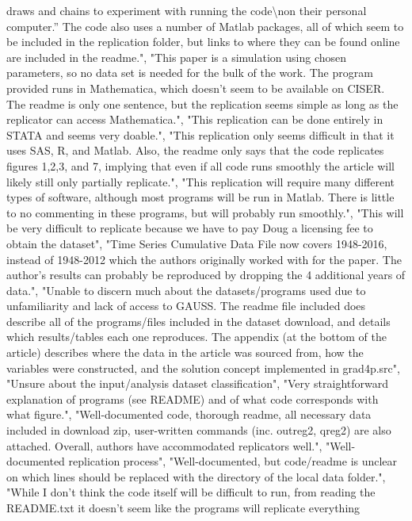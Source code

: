 \documentclass[]{article}
\begin{document}
\begin{itemize}
  draws and chains to experiment with running the
  code\textbackslash{}non their personal computer.'' The code also uses
  a number of Matlab packages, all of which seem to be included in the
  replication folder, but links to where they can be found online are
  included in the readme.", "This paper is a simulation using chosen
  parameters, so no data set is needed for the bulk of the work. The
  program provided runs in Mathematica, which doesn't seem to be
  available on CISER. The readme is only one sentence, but the
  replication seems simple as long as the replicator can access
  Mathematica.", "This replication can be done entirely in STATA and
  seems very doable.", "This replication only seems difficult in that it
  uses SAS, R, and Matlab. Also, the readme only says that the code
  replicates figures 1,2,3, and 7, implying that even if all code runs
  smoothly the article will likely still only partially replicate.",
  "This replication will require many different types of software,
  although most programs will be run in Matlab. There is little to no
  commenting in these programs, but will probably run smoothly.", "This
  will be very difficult to replicate because we have to pay Doug a
  licensing fee to obtain the dataset", "Time Series Cumulative Data
  File now covers 1948-2016, instead of 1948-2012 which the authors
  originally worked with for the paper. The author's results can
  probably be reproduced by dropping the 4 additional years of data.",
  "Unable to discern much about the datasets/programs used due to
  unfamiliarity and lack of access to GAUSS. The readme file included
  does describe all of the programs/files included in the dataset
  download, and details which results/tables each one reproduces. The
  appendix (at the bottom of the article) describes where the data in
  the article was sourced from, how the variables were constructed, and
  the solution concept implemented in grad4p.src", "Unsure about the
  input/analysis dataset classification", "Very straightforward
  explanation of programs (see README) and of what code corresponds with
  what figure.", "Well-documented code, thorough readme, all necessary
  data included in download zip, user-written commands (inc. outreg2,
  qreg2) are also attached. Overall, authors have accommodated
  replicators well.", "Well-documented replication process",
  "Well-documented, but code/readme is unclear on which lines should be
  replaced with the directory of the local data folder.", "While I don't
  think the code itself will be difficult to run, from reading the
  README.txt it doesn't seem like the programs will replicate everything

\end{itemize}
\end{document}
